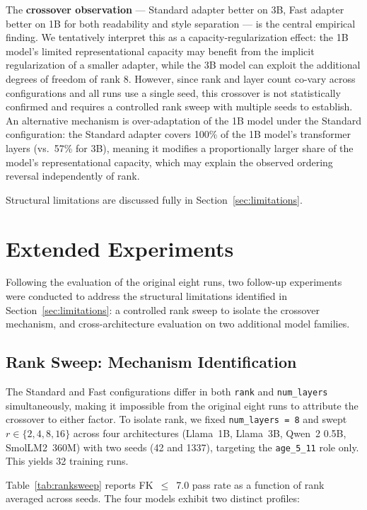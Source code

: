 \documentclass[journal]{IEEEtai}
\begin{document}
The \textbf{crossover observation} --- Standard adapter better on 3B, Fast adapter better on 1B for both readability and style separation --- is the central empirical finding. We tentatively interpret this as a capacity-regularization effect: the 1B model's limited representational capacity may benefit from the implicit regularization of a smaller adapter, while the 3B model can exploit the additional degrees of freedom of rank 8. However, since rank and layer count co-vary across configurations and all runs use a single seed, this crossover is not statistically confirmed and requires a controlled rank sweep with multiple seeds to establish. An alternative mechanism is over-adaptation of the 1B model under the Standard configuration: the Standard adapter covers 100\% of the 1B model's transformer layers (vs.\ 57\% for 3B), meaning it modifies a proportionally larger share of the model's representational capacity, which may explain the observed ordering reversal independently of rank.

Structural limitations are discussed fully in Section~\ref{sec:limitations}.

\section{Extended Experiments}\label{sec:extended}

Following the evaluation of the original eight runs, two follow-up experiments were conducted to address the structural limitations identified in Section~\ref{sec:limitations}: a controlled rank sweep to isolate the crossover mechanism, and cross-architecture evaluation on two additional model families.

\subsection{Rank Sweep: Mechanism Identification}\label{sec:ranksweep}

The Standard and Fast configurations differ in both \texttt{rank} and \texttt{num\_layers} simultaneously, making it impossible from the original eight runs to attribute the crossover to either factor. To isolate rank, we fixed \texttt{num\_layers~=~8} and swept $r \in \{2, 4, 8, 16\}$ across four architectures (Llama~1B, Llama~3B, Qwen~2 0.5B, SmolLM2~360M) with two seeds (42 and 1337), targeting the \texttt{age\_5\_11} role only. This yields 32 training runs.

Table~\ref{tab:ranksweep} reports FK~$\leq$~7.0 pass rate as a function of rank averaged across seeds. The four models exhibit two distinct profiles:
\end{document}
